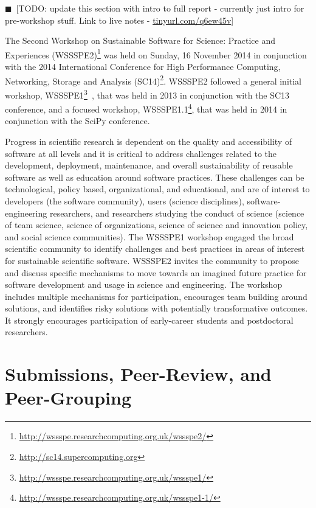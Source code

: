 \documentclass[11pt, oneside]{amsart}
\newcommand{\todo}[1]{{\color{blue}$\blacksquare$~\textsf{[TODO: #1]}}}
\begin{document}
\todo{update this section with intro to full report - currently just intro for pre-workshop stuff. Link to live notes -
\url{tinyurl.com/q6ew45v}}

The Second Workshop on Sustainable Software for Science: Practice and
Experiences
(WSSSPE2)\footnote{\url{http://wssspe.researchcomputing.org.uk/wssspe2/}} was
held on Sunday, 16 November 2014 in conjunction with the 2014 International
Conference for High Performance Computing, Networking, Storage and Analysis
(SC14)\footnote{\url{http://sc14.supercomputing.org}}.
WSSSPE2 followed a general initial workshop,
WSSSPE1\footnote{\url{http://wssspe.researchcomputing.org.uk/wssspe1/}}~\cite{WSSSPE1-pre-report,WSSSPE1},
that was held in 2013 in conjunction with the SC13 conference, and a focused
workshop,
WSSSPE1.1\footnote{\url{http://wssspe.researchcomputing.org.uk/wssspe1-1/}},
that was held in 2014 in conjunction with the SciPy conference.

Progress in scientific research is dependent on the quality and accessibility of
software at all levels and it is critical to address challenges related to the
development, deployment, maintenance, and overall sustainability of reusable
software as well as education around software practices. These challenges can be
technological, policy based, organizational, and educational, and are of
interest to developers (the software community), users (science disciplines),
software-engineering researchers, and researchers studying the conduct of
science (science of team science, science of organizations, science of science
and innovation policy, and social science communities). The WSSSPE1 workshop
engaged the broad scientific community to identify challenges and best practices
in areas of interest for sustainable scientific software. WSSSPE2 invites the
community to propose and discuss specific mechanisms to move towards an imagined
future practice for software development and usage in science and engineering.
The workshop includes multiple mechanisms for participation, encourages team
building around solutions, and identifies risky solutions with potentially
transformative outcomes. It strongly encourages participation of early-career
students and postdoctoral researchers.



\section{Submissions, Peer-Review, and Peer-Grouping}
\end{document}
